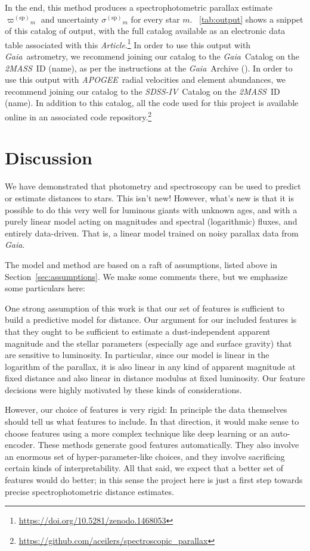 \documentclass[modern]{aastex62}
\newcommand{\documentname}{\textsl{Article}}
\newcommand{\sectionname}{Section}
\newcommand{\acronym}[1]{{\small{#1}}}
\newcommand{\project}[1]{\textsl{#1}}
\newcommand{\apogee}{\project{\acronym{APOGEE}}}
\newcommand{\gaia}{\project{Gaia}}
\newcommand{\zmass}{\project{\acronym{2MASS}}}
\newcommand{\sdssiv}{\project{\acronym{SDSS-IV}}}
\newcommand{\sparallax}{{\varpi^{(\mathrm{sp})}}}
\newcommand{\ssigma}{{\sigma^{(\mathrm{sp})}}}
\begin{document}
In the end, this method produces a spectrophotometric parallax estimate $\sparallax_m$
and uncertainty $\ssigma_m$ for every star $m$.
\tablename~\ref{tab:output} shows a snippet of this catalog of output, with the full catalog available
as an electronic data table associated with this \documentname.\footnote{\url{https://doi.org/10.5281/zenodo.1468053}}
In order to use this output with \gaia\ astrometry, we recommend joining our catalog to the
\gaia\ Catalog on the \zmass\ ID (name), as per the instructions at the \gaia\ Archive (\citealt{gaiaarchive}).
In order to use this output with \apogee\ radial velocities and element abundances, we recommend
joining our catalog to the \sdssiv\ Catalog on the \zmass\ ID (name).
In addition to this catalog, all the code used for this project is available online in an associated
code repository.\footnote{\url{https://github.com/aceilers/spectroscopic_parallax}}

\section{Discussion}\label{sec:discussion}

We have demonstrated that photometry and spectroscopy can be used to predict
or estimate distances to stars.
This isn't new!
However, what's new is that it is possible to do this very well for luminous giants
with unknown ages, and with a purely
linear model acting on magnitudes and spectral (logarithmic) fluxes, and entirely
data-driven.
That is, a linear model trained on noisy parallax data from \gaia.

The model and method are based on a raft of assumptions, listed above
in \sectionname~\ref{sec:assumptions}.
We make some comments there, but we emphasize some particulars here:

One strong assumption of this work is that our set of features is sufficient to
build a predictive model for distance.
Our argument for our included features is that they ought to be sufficient to
estimate a dust-independent apparent magnitude and the stellar parameters (especially
age and surface gravity) that are sensitive to luminosity.
In particular, since our model is linear in the logarithm of the parallax, it is
also linear in any kind of apparent magnitude at fixed distance and also linear
in distance modulus at fixed luminosity.
Our feature decisions were highly motivated by these kinds of considerations.

However, our choice of features is very rigid:
In principle the data themselves should tell us what features to include.
In that direction, it would make sense to choose features using a more complex
technique like deep learning or an auto-encoder.
These methods generate good features automatically.
They also involve an enormous set of hyper-parameter-like choices,
and they involve sacrificing certain kinds of interpretability.
All that said, we expect that a better set of features would do better; in this sense
the project here is just a first step towards precise spectrophotometric distance
estimates.
\end{document}
